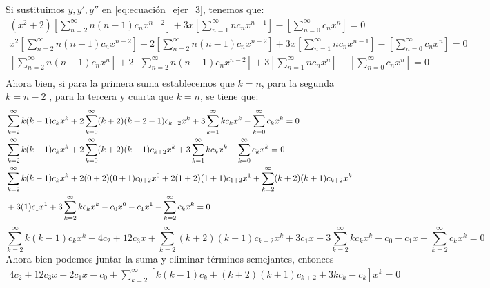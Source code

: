 Si sustituimos $y,y',y''$ en \ref{eq:ecuación_ejer_3}, tenemos que:
\begin{equation*}
\begin{split}
         (x^{2}+2) \left[\sum_{n = 2}^{\infty}n(n -1)c_{n}x^{n -2}\right] +3x \left[\sum_{n = 1}^{\infty}nc_{n}x^{n -1}\right]- \left[ \sum_{n = 0}^{\infty}c_{n}x^{n} \right] = 0 \\
x^{2}\left[\sum_{n = 2}^{\infty}n(n -1)c_{n}x^{n -2}\right]
+2\left[\sum_{n = 2}^{\infty}n(n -1)c_{n}x^{n -2}\right]
+3x \left[\sum_{n = 1}^{\infty}nc_{n}x^{n -1}\right]
-\left[ \sum_{n = 0}^{\infty}c_{n}x^{n} \right] = 0 \\
        \left[\sum_{n = 2}^{\infty}n(n -1)c_{n}x^{n}\right]
        +2\left[\sum_{n = 2}^{\infty}n(n -1)c_{n}x^{n -2}\right]
        +3 \left[\sum_{n = 1}^{\infty}nc_{n}x^{n}\right]
        -\left[ \sum_{n = 0}^{\infty}c_{n}x^{n} \right] = 0 \\
\end{split}
\end{equation*}
Ahora bien, si para la primera suma establecemos que $k=n$, para la segunda $k=n-2$ , para la tercera  y cuarta que $k=n$, se tiene que:
\begin{equation*}
\centering
    \begin{split}
        &\sum_{k=2}^{\infty} k(k-1) c_{k} x^{k}+2 \sum_{k=0}^{\infty}(k+2)(k+2-1) c_{k+2} x^{k}+3 \sum_{k=1}^{\infty} k c_{k} x^{k}-\sum_{k=0}^{\infty} c_{k} x^{k}=0 \\
        &\sum_{k=2}^{\infty} k(k-1) c_{k} x^{k}+2 \sum_{k=0}^{\infty}(k+2)(k+1) c_{k+2} x^{k}+3 \sum_{k=1}^{\infty} k c_{k} x^{k}-\sum_{k=0}^{\infty} c_{k} x^{k}=0 \\
        &\sum_{k=2}^{\infty} k(k-1) c_{k} x^{k}+2(0+2)(0+1) c_{0+2} x^{0}+2(1+2)(1+1) c_{1+2} x^{1}+\sum_{k=2}^{\infty}(k+2)(k+1) c_{k+2} x^{k} \\
        &+3(1) c_{1} x^{1}+3 \sum_{k=2}^{\infty} k c_{k} x^{k}-c_{0} x^{0}-c_{1} x^{1}-\sum_{k=2}^{\infty} c_{k} x^{k}=0 \\
    \end{split}
\end{equation*}
\begin{equation*}
       \sum_{k=2}^{\infty} k(k-1) c_{k} x^{k}+4 c_{2}+12 c_{3} x+\sum_{k=2}^{\infty}(k+2)(k+1) c_{k+2} x^{k}+3 c_{1} x+3 \sum_{k=2}^{\infty} k c_{k} x^{k}-c_{0}-c_{1} x-\sum_{k=2}^{\infty} c_{k} x^{k}=0
\end{equation*}
Ahora bien podemos juntar la suma y eliminar términos semejantes, entonces
\begin{equation*}
    \begin{split}
        4 c_{2}+12 c_{3} x+2 c_{1} x-c_{0}+\sum_{k=2}^{\infty}\left[k(k-1) c_{k}+(k+2)(k+1) c_{k+2}+3 k c_{k}-c_{k}\right] x^{k}=0 \\
    \end{split}
\end{equation*}
